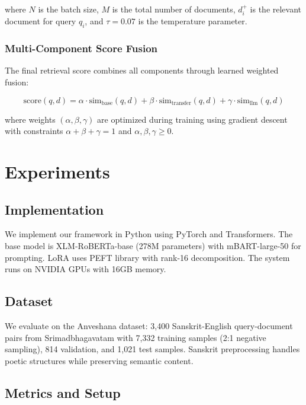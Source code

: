 \documentclass[runningheads]{llncs}
\begin{document}
where $N$ is the batch size, $M$ is the total number of documents, $d_i^+$ is the relevant document for query $q_i$, and $\tau=0.07$ is the temperature parameter.

\subsubsection{Multi-Component Score Fusion}
The final retrieval score combines all components through learned weighted fusion:

\begin{equation}
\text{score}(q,d) = \alpha \cdot \text{sim}_{\text{base}}(q,d) + \beta \cdot \text{sim}_{\text{transfer}}(q,d) + \gamma \cdot \text{sim}_{\text{llm}}(q,d)
\end{equation}

where weights $(\alpha, \beta, \gamma)$ are optimized during training using gradient descent with constraints $\alpha + \beta + \gamma = 1$ and $\alpha, \beta, \gamma \geq 0$.

\section{Experiments}
\label{sec:experiments}

\subsection{Implementation}

We implement our framework in Python using PyTorch and Transformers. The base model is XLM-RoBERTa-base (278M parameters) with mBART-large-50 for prompting. LoRA uses PEFT library with rank-16 decomposition. The system runs on NVIDIA GPUs with 16GB memory.

\subsection{Dataset}

We evaluate on the Anveshana dataset: 3,400 Sanskrit-English query-document pairs from Srimadbhagavatam with 7,332 training samples (2:1 negative sampling), 814 validation, and 1,021 test samples. Sanskrit preprocessing handles poetic structures while preserving semantic content.

\subsection{Metrics and Setup}
\end{document}
